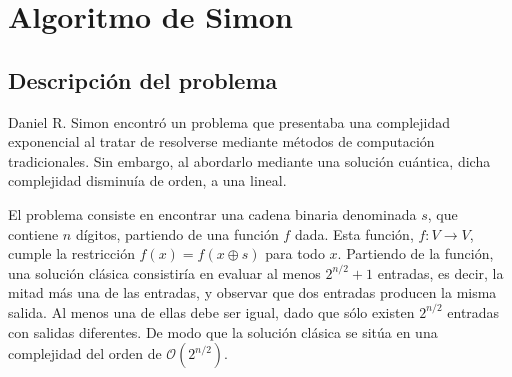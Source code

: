 \documentclass{article}
\theoremstyle{definition}
\begin{document}
\newpage

\section{Algoritmo de Simon}
\subsection{Descripción del problema}

Daniel R. Simon encontró un problema que presentaba una complejidad exponencial 
al tratar de resolverse mediante métodos de computación tradicionales. Sin 
embargo, al abordarlo mediante una solución cuántica, dicha complejidad 
disminuía de orden, a una lineal.

El problema consiste en encontrar una cadena binaria denominada $s$, que 
contiene $n$ dígitos, partiendo de una función $f$ dada. Esta función, $f:V 
\rightarrow V$, cumple la restricción $f(x) = f(x \oplus s)$ para todo $x$.  
Partiendo de la función, una solución clásica consistiría en evaluar al menos 
$2^{n/2} + 1$ entradas, es decir, la mitad más una de las entradas, y observar 
que dos entradas producen la misma salida. Al menos una de ellas debe ser igual, 
dado que sólo existen $2^{n/2}$ entradas con salidas diferentes. De modo que la 
solución clásica se sitúa en una complejidad del orden de 
$\mathcal{O}(2^{n/2})$.
\end{document}
